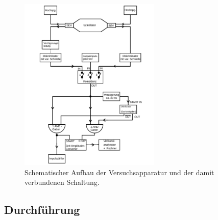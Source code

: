 %
\begin{figure}[htb]
  \centering
  \includegraphics[width=0.6\textwidth]{figures/versuchsaufbau.pdf}
  \caption{Schematischer Aufbau der Versuchsapparatur und der damit verbundenen Schaltung. \cite{V01}}
  \label{fig:aufbau}
\end{figure}
%
\subsection{Durchführung}

